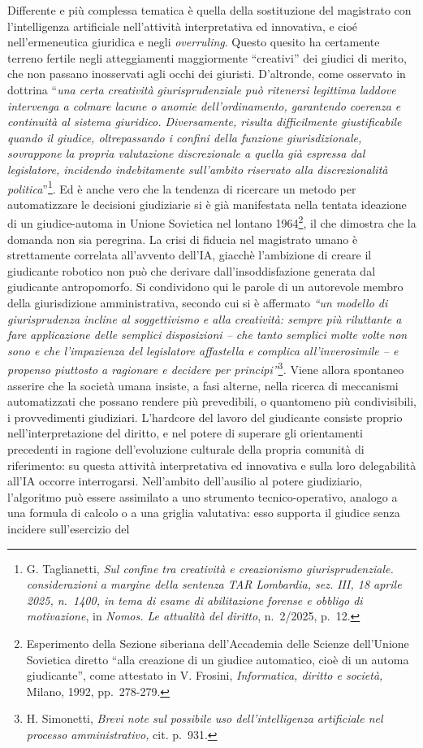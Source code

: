 \documentclass[american,a4paper,]{article}
\begin{document}
Differente e più complessa tematica è quella della sostituzione del magistrato con l'intelligenza artificiale nell'attività interpretativa ed innovativa, e cioé nell'ermeneutica giuridica e negli \emph{overruling}. Questo quesito ha certamente terreno fertile negli atteggiamenti maggiormente ``creativi'' dei giudici di merito, che non passano inosservati agli occhi dei giuristi. D'altronde, come osservato in dottrina ``\emph{una certa creatività giurisprudenziale può ritenersi legittima laddove intervenga a colmare lacune o anomie dell'ordinamento, garantendo coerenza e continuità al sistema giuridico. Diversamente, risulta difficilmente giustificabile quando il giudice, oltrepassando i confini della funzione giurisdizionale, sovrappone la propria valutazione discrezionale a quella già espressa dal legislatore, incidendo indebitamente sull'ambito riservato alla discrezionalità politica}''\footnote{G. Taglianetti, \emph{Sul confine tra creatività e creazionismo giurisprudenziale. considerazioni a margine della sentenza TAR Lombardia, sez. III, 18 aprile 2025, n.~1400, in tema di esame di abilitazione forense e obbligo di motivazione}, in \emph{Nomos. Le attualità del diritto}, n.~2/2025, p.~12.}. Ed è anche vero che la tendenza di ricercare un metodo per automatizzare le decisioni giudiziarie si è già manifestata nella tentata ideazione di un giudice-automa in Unione Sovietica nel lontano 1964\footnote{Esperimento della Sezione siberiana dell'Accademia delle Scienze dell'Unione Sovietica diretto ``alla creazione di un giudice automatico, cioè di un automa giudicante'', come attestato in V. Frosini, \emph{Informatica, diritto e società,} Milano, 1992, pp.~278-279.}, il che dimostra che la domanda non sia peregrina. La crisi di fiducia nel magistrato umano è strettamente correlata all'avvento dell'IA, giacchè l'ambizione di creare il giudicante robotico non può che derivare dall'insoddisfazione generata dal giudicante antropomorfo. Si condividono qui le parole di un autorevole membro della giurisdizione amministrativa, secondo cui si è affermato \emph{``\emph{un modello di giurisprudenza incline al soggettivismo e alla creatività: sempre più riluttante a fare applicazione delle semplici disposizioni -- che tanto semplici molte volte non sono e che l'impazienza del legislatore affastella e complica all'inverosimile -- e propenso piuttosto a ragionare e decidere per principi}''}\footnote{H. Simonetti, \emph{Brevi note sul possibile uso dell'intelligenza artificiale nel processo amministrativo,} cit. p.~931.}\emph{.} Viene allora spontaneo asserire che la società umana insiste, a fasi alterne, nella ricerca di meccanismi automatizzati che possano rendere più prevedibili, o quantomeno più condivisibili, i provvedimenti giudiziari. L'hardcore del lavoro del giudicante consiste proprio nell'interpretazione del diritto, e nel potere di superare gli orientamenti precedenti in ragione dell'evoluzione culturale della propria comunità di riferimento: su questa attività interpretativa ed innovativa e sulla loro delegabilità all'IA occorre interrogarsi. Nell'ambito dell'ausilio al potere giudiziario, l'algoritmo può essere assimilato a uno strumento tecnico-operativo, analogo a una formula di calcolo o a una griglia valutativa: esso supporta il giudice senza incidere sull'esercizio del 
\end{document}
